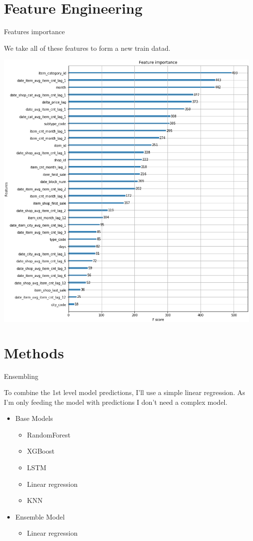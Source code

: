 \documentclass[
 size=12pt,
 paper=smartboard, %
 mode=present, %
 display=slides, %
 style=tuliplab,  %
 pauseslide,
 fleqn,leqno,clock]{powerdot}
\begin{document}
\section{Feature Engineering}


\begin{slide}{Features importance}

	We take all of these features
	to form a new train datad.

	\begin{center}
		\includegraphics[width=.5\linewidth]{figures/FEATURE.eps}
	\end{center}

\end{slide}

\section{Methods}

\begin{slide}{Ensembling}

	To combine the 1st level model predictions,
	I'll use a simple linear regression.
	As I'm only feeding the model with
	predictions I don't need a complex model.

	\begin{center}
		\begin{itemize}
			\item Base Models
			      \
			      \begin{itemize}
				      \item RandomForest
				      \item XGBoost
				      \item LSTM
				      \item Linear regression
				      \item KNN
			      \end{itemize}
			\item Ensemble Model
			      \
			      \begin{itemize}
				      \item Linear regression
			      \end{itemize}
		\end{itemize}
	\end{center}
\end{slide}
\end{document}
